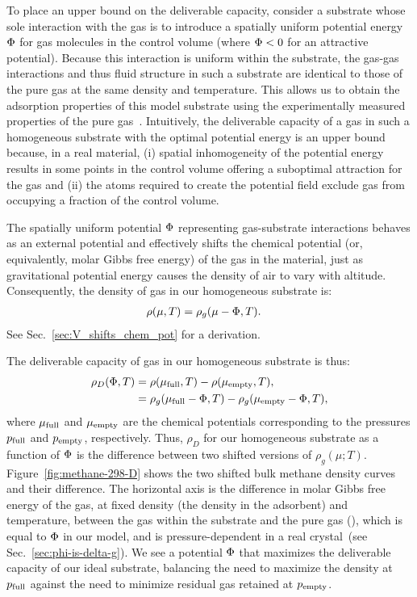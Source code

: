 To place an upper bound on the deliverable capacity, consider a substrate whose
sole interaction with the gas is to introduce a spatially uniform potential
energy $\Phi$ for gas molecules in the control volume (where $\Phi<0$ for an
attractive potential). Because this interaction is uniform within the
substrate, the gas-gas interactions and thus fluid structure in such a
substrate are identical to those of the pure gas at the same density and
temperature. This allows us to obtain the adsorption properties of this model
substrate using the experimentally measured properties of the pure
gas~\cite{nist}. Intuitively, the deliverable capacity of a gas in such a
homogeneous substrate with the optimal potential energy is an upper bound
because, in a real material, (i) spatial inhomogeneity of the potential
energy results in some points in the control volume offering a suboptimal
attraction for the gas and (ii) the atoms required to create the potential
field exclude gas from occupying a fraction of the control volume.

The spatially uniform potential $\Phi$ representing gas-substrate interactions
behaves as an external potential and effectively shifts the chemical potential
(or, equivalently, molar Gibbs free energy) of the gas in the material, just as
gravitational potential energy causes the density of air to vary with altitude.
Consequently, the density of gas in our homogeneous substrate is:
\begin{align}
    \rho(\mu,T) &= \rho_g(\mu - \Phi,T). \label{eq:mof-density}
\end{align}
See Sec.~\ref{sec:V_shifts_chem_pot} for a derivation.

The deliverable capacity of gas in our homogeneous substrate is thus:
\begin{align}
    \rho_D(\Phi,T) &= \rho(\mu_{\text{full}},T) - \rho(\mu_{\text{empty}},T),
    \label{eq:DofPhi}
    \\
    &= \rho_g(\mu_{\text{full}}-\Phi,T) - \rho_g(\mu_{\text{empty}}-\Phi,T),
\end{align}
where $\mu_{\text{full}}$ and $\mu_{\text{empty}}$ are the chemical potentials corresponding to the
pressures $p_{\text{full}}$ and $p_{\text{empty}}$, respectively. Thus, $\rho_D$ for our
homogeneous substrate as a function of $\Phi$ is the difference between two
shifted versions of $\rho_g(\mu; T)$. Figure~\ref{fig:methane-298-D} shows the
two shifted bulk methane density curves and their difference. The horizontal
axis is the difference in molar Gibbs free energy of the gas, at fixed density (the density in the adsorbent) and temperature, between the gas within the substrate and the pure gas (\gst),
which is equal to $\Phi$ in our model, and is pressure-dependent in a real
crystal~(see Sec.~\ref{sec:phi-is-delta-g}). We see a potential $\Phi$ that
maximizes the deliverable capacity of our ideal substrate, balancing the need
to maximize the density at $p_{\text{full}}$ against the need to minimize residual gas
retained at $p_{\text{empty}}$.

